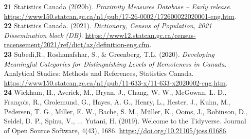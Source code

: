 \documentclass[11pt, a4paper]{article}
\newcommand{\comment}[1]{}
\begin{document}
\noindent\textbf{21} Statistics Canada (2020b). \textit{Proximity Measures Database – Early release}. \sloppy\url{https://www150.statcan.gc.ca/n1/pub/17-26-0002/172600022020001-eng.htm}. \\



\noindent\textbf{22} Statistics Canada. (2021). \textit{Dictionary, Census of Population, 2021  Dissemination block (DB)}. \sloppy\url{https://www12.statcan.gc.ca/census-recensement/2021/ref/dict/az/definition-eng.cfm}. \\

\noindent\textbf{23} Subedi,R., Roshanafshar, S., \& Greenberg, T.L. (2020). \textit{Developing Meaningful Categories for Distinguishing Levels of Remoteness in Canada}. Analytical Studies: Methods and References, Statistics Canada. \sloppy\url{https://www150.statcan.gc.ca/n1/pub/11-633-x/11-633-x2020002-eng.htm}. \\

\noindent\textbf{24} Wickham, H., Averick, M., Bryan, J., Chang, W. W., McGowan, L. D., François, R., Grolemund, G., Hayes, A. G., Henry, L., Hester, J., Kuhn, M., Pedersen, T. G., Miller, E. W., Bache, S. M., Müller, K., Ooms, J., Robinson, D., Seidel, D. P., Spinu, V., ... Yutani, H. (2019). Welcome to the Tidyverse. Journal of Open Source Software, 4(43), 1686. \sloppy\url{https://doi.org/10.21105/joss.01686}. \\











\comment{

\renewcommand{\bibsection}{}

}






\pagebreak
\appendix
\end{document}
